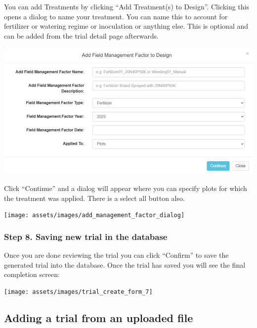 \documentclass[
  12pt,
]{book}
\begin{document}
You can add Treatments by clicking ``Add Treatment(s) to Design''. Clicking this opens a dialog to name your treatment. You can name this to account for fertilizer or watering regime or inoculation or anything else. This is optional and can be added from the trial detail page afterwards.

\begin{center}\includegraphics[width=0.95\linewidth]{assets/images/add_management_factor_name_dialog} \end{center}

Click ``Continue'' and a dialog will appear where you can specify plots for which the treatment was applied. There is a select all button also.

\begin{center}\texttt{[image: assets/images/add\_management\_factor\_dialog]} \end{center}

\hypertarget{step-8.-saving-new-trial-in-the-database}{%
\subsubsection*{Step 8. Saving new trial in the database}\label{step-8.-saving-new-trial-in-the-database}}


Once you are done reviewing the trial you can click ``Confirm'' to save the generated trial into the database. Once the trial has saved you will see the final completion screen:

\begin{center}\texttt{[image: assets/images/trial\_create\_form\_7]} \end{center}

\hypertarget{adding-a-trial-from-an-uploaded-file}{%
\subsection{Adding a trial from an uploaded file}\label{adding-a-trial-from-an-uploaded-file}}
\end{document}

